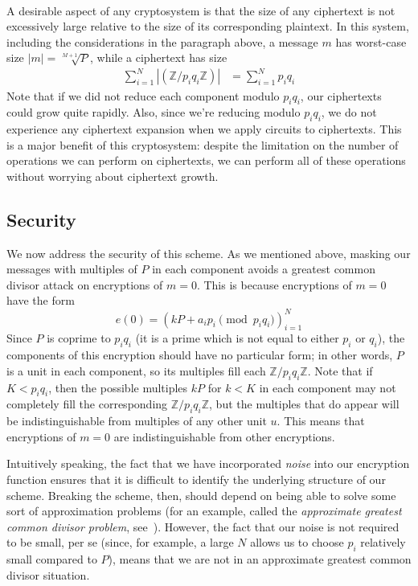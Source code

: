 \documentclass[11pt]{report}
\newcommand{\Z}{\mathbb{Z}}
\begin{document}
\

A desirable aspect of any cryptosystem is that the size of any ciphertext is not excessively large relative to the size of its corresponding plaintext. In this system, including the considerations in the paragraph above, a message $m$ has worst-case size $|m|=\sqrt[M+1]{P}$, while a ciphertext has size
\begin{align*}
\sum_{i=1}^N\left|(\Z/p_iq_i\Z)\right| &= \sum_{i=1}^Np_iq_i
\end{align*}
Note that if we did not reduce each component modulo $p_iq_i$, our ciphertexts could grow quite rapidly. Also, since we're reducing modulo $p_iq_i$, we do not experience any ciphertext expansion when we apply circuits to ciphertexts. This is a major benefit of this cryptosystem: despite the limitation on the number of operations we can perform on ciphertexts, we can perform all of these operations without worrying about ciphertext growth.


\subsection{Security}
\label{sec:cbe_security}
We now address the security of this scheme. As we mentioned above, masking our messages with multiples of $P$ in each component avoids a greatest common divisor attack on encryptions of $m=0$. This is because encryptions of $m=0$ have the form
\[ e(0) = (kP+a_ip_i \pmod{p_iq_i})_{i=1}^N \]
Since $P$ is coprime to $p_iq_i$ (it is a prime which is not equal to either $p_i$ or $q_i$), the components of this encryption should have no particular form; in other words, $P$ is a unit in each component, so its multiples fill each $\Z/p_iq_i\Z$. Note that if $K<p_iq_i$, then the possible multiples $kP$ for $k<K$ in each component may not completely fill the corresponding $\Z/p_iq_i\Z$, but the multiples that do appear will be indistinguishable from multiples of any other unit $u$. This means that encryptions of $m=0$ are indistinguishable from other encryptions.

Intuitively speaking, the fact that we have incorporated \emph{noise} into our encryption function ensures that it is difficult to identify the underlying structure of our scheme. Breaking the scheme, then, should depend on being able to solve some sort of  approximation problems (for an example, called the \emph{approximate greatest common divisor problem}, see~\cite{van-dijk-fhe-over-z}). However, the fact that our noise is not required to be small, per se (since, for example, a large $N$ allows us to choose $p_i$ relatively small compared to $P$), means that we are not in an approximate greatest common divisor situation.
\end{document}
